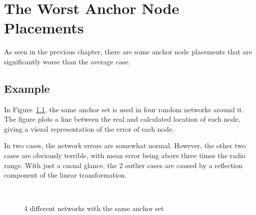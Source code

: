 \chapter{The Worst Anchor Node Placements}
As seen in the previous chapter, there are some anchor node placements that are significantly worse than the average case. 

\section{Example}

In Figure~\ref{fig:AS6}, the same anchor set is used in four random networks around it.  The figure plots a line between the real and calculated location of each node, giving a visual representation of the error of each node.  

In two cases, the network errors are somewhat normal.  However, the other two cases are obviously terrible, with mean error being above three times the radio range.  With just a casual glance, the 2 outlier cases are caused by a reflection component of the linear transformation.  
\begin{figure}
  \centering
	\\
	\caption{4 different networks with the same anchor set}	
	\label{fig:AS6}
\end{figure}
